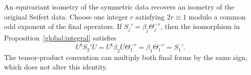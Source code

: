 \begin{remark}
\label{global:recover-seifert}
An equivariant isometry of the symmetric data recovers an isometry
of the original Seifert data.  Choose one integer $r$ satisfying
$2r\equiv1$ modulo a common odd exponent of the final operators.
If $S_j'=\beta_j\Theta_j^{-r}$, then the isomorphism in
Proposition~\ref{global:integral} satisfies
\[
 U^{\mathsf t}S_2'U
 =U^{\mathsf t}\beta_2U\Theta_1^{-r}
 =\beta_1\Theta_1^{-r}=S_1'.
\]
The tensor-product convention can multiply both final forms by
the same sign, which does not alter this identity.
\end{remark}
